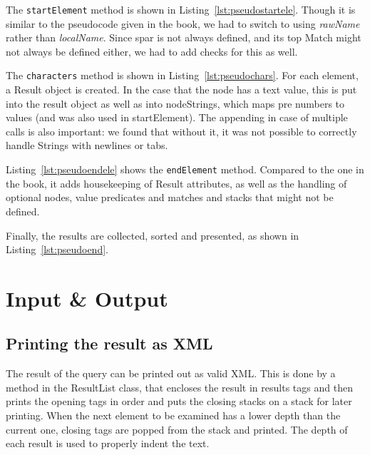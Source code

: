 \documentclass[11pt]{article}
\begin{document}

The \lstinline{startElement} method is shown in Listing~\ref{lst:pseudostartele}. Though it is similar to the pseudocode given in the book, we had to switch to using \emph{rawName} rather than \emph{localName}. Since spar is not always defined, and its top Match might not always be defined either, we had to add checks for this as well.


The \lstinline{characters} method is shown in Listing~\ref{lst:pseudochars}. For each element, a Result object is created. 
In the case that the node has a text value, this is put into the result object as well as into nodeStrings, which maps pre numbers to values (and was also used in startElement).
The appending in case of multiple calls is also important: we found that without it, it was not possible to correctly handle Strings with newlines or tabs.


Listing~\ref{lst:pseudoendele} shows the \lstinline{endElement} method. Compared to the one in the book, it adds housekeeping of Result attributes, as well as the handling of optional nodes, value predicates and matches and stacks that might not be defined.


Finally, the results are collected, sorted and presented, as shown in Listing~\ref{lst:pseudoend}.

\section{Input \& Output}
\subsection{Printing the result as XML}
The result of the query can be printed out as valid XML. This is done by a method in the ResultList class, that encloses the result in results tags and then prints the opening tags in order and puts the closing stacks on a stack for later printing. When the next element to be examined has a lower depth than the current one, closing tags are popped from the stack and printed. The depth of each result is used to properly indent the text.
\end{document}
